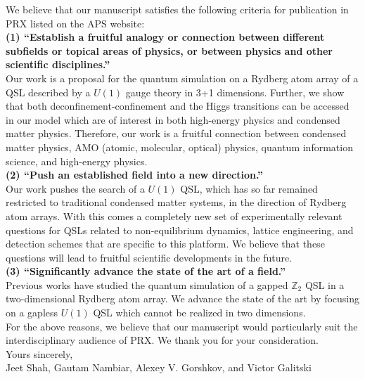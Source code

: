 \documentclass[12pt]{article}
\begin{document}
We believe that our manuscript satisfies the following criteria for publication in PRX listed on the APS website:\\

\noindent \textbf{(1) “Establish a fruitful analogy or connection between different subfields or topical areas of physics, or between physics and other scientific disciplines.”}\\ 
\indent Our work is a proposal for the quantum simulation on a Rydberg atom array of a QSL described by a $U(1)$ gauge theory in 3+1 dimensions. Further, we show that both deconfinement-confinement and the Higgs transitions can be accessed in our model which are of interest in both high-energy physics and condensed matter physics. Therefore, our work is a fruitful connection between condensed matter physics, AMO (atomic, molecular, optical) physics, quantum information science, and high-energy physics.\\


\noindent \textbf{(2) “Push an established field into a new direction.”}\\
\indent	 Our work pushes the search of a $U(1)$ QSL, which has so far remained restricted to traditional condensed matter systems, in the direction of Rydberg atom arrays. With this comes a completely new set of experimentally relevant questions for QSLs related to non-equilibrium dynamics, lattice engineering, and detection schemes that are specific to this platform. We believe that these questions will lead to fruitful scientific developments in the future.\\

\noindent \textbf{(3) “Significantly advance the state of the art of a field.”}\\
\indent	Previous works have studied the quantum simulation of a gapped $\mathbb{Z}_2$ QSL in a two-dimensional Rydberg atom array. We advance the state of the art by focusing on a gapless $U(1)$ QSL which cannot be realized in two dimensions.\\

For the above reasons, we believe that our manuscript would particularly suit the interdisciplinary audience of PRX. We thank you for your consideration.\\

\noindent Yours sincerely,\\
Jeet Shah, Gautam Nambiar, Alexey V. Gorshkov, and Victor Galitski
\end{document}
